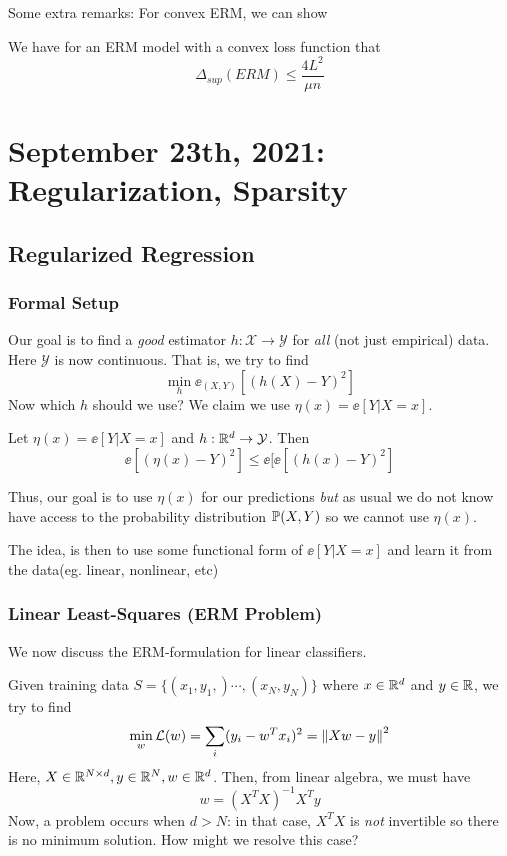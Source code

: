 \documentclass[11pt]{scrartcl}
\begin{document}
Some extra remarks:
For convex ERM, we can show 
\begin{thm}
We have for an ERM model with a convex loss function that 
$$\Delta_{sup}(ERM) \le \frac{4L^2}{\mu{n}}$$
\end{thm}
\newpage

\section{September 23th, 2021: Regularization, Sparsity}

\subsection{Regularized Regression}
\subsubsection{Formal Setup}
Our goal is to find a \textit{good} estimator $h: \mathcal{X} \to \mathcal{{Y}}$ for \textit{all} (not just empirical) data. Here $\mathcal{Y}$ is now continuous. That is, we try to find $$\min_{h}\ee_{(X,Y)}[(h(X)-Y)^2]$$ 
Now which $h$ should we use? We claim we use $\eta(x)=\ee[Y|X=x]$. 
\begin{thm}
Let $\eta(x)=\ee[Y|X=x]$ and $h: \mathbb{R}^d \to \mathcal{Y}$. Then
$$\ee[(\eta(x)-Y)^2] \le \ee[\ee[(h(x)-Y)^2]$$
\end{thm}

Thus, our goal is to use $\eta(x)$ for our predictions \textit{but} as usual we do not know have access to the probability distribution $\mathbb{P}(X,Y)$ so we cannot use $\eta(x)$. 

The idea, is then to use some functional form of $\ee[Y|X=x]$ and learn it from the data(eg. linear, nonlinear, etc)

\subsubsection{Linear Least-Squares (ERM Problem)}
We now discuss the ERM-formulation for linear classifiers.

Given training data $S=\{(x_1,y_1,)\cdots,(x_N,y_N)\}$ where $x \in \mathbb{R}^d$ and $y \in \mathbb{R}$, we try to find $$\min_{w} \mathcal{L}(w)=\sum_{i}(y_i-w^{T}x_i)^2=\left\lVert Xw-y\right\rVert^2$$
Here, $X \in \mathbb{R}^{N\times{d}}, y \in \mathbb{R}^{N}, w \in \mathbb{R}^{d}$. Then, from linear algebra, we must have $$w=(X^{T}X)^{-1}X^{T}y$$
Now, a problem occurs when $d>N$: in that case, $X^{T}X$ is \textit{not} invertible so there is no minimum solution. How might we resolve this case?
\end{document}
